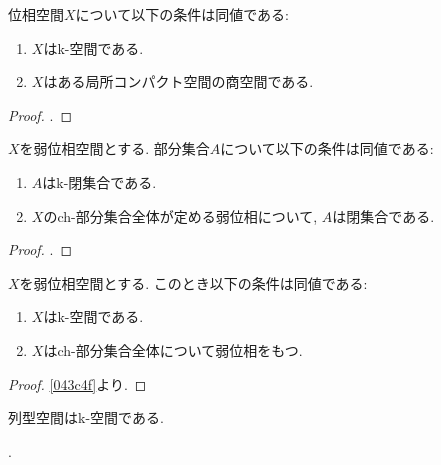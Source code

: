 \documentclass[uplatex, dvipdfmx, a4paper, 12pt, class=jsbook, crop=false]{standalone}
\begin{document}
\begin{proposition}
	位相空間$X$について以下の条件は同値である:
	\begin{enumerate}
		\item $X$はk-空間である.
		\item $X$はある局所コンパクト\Hausdorff 空間の商空間である.
	\end{enumerate}
\end{proposition}

\begin{proof}
	\WIP.
\end{proof}

\begin{proposition}
	\label{043c4f}
	$X$を弱\Hausdorff 位相空間とする.
	部分集合$A$について以下の条件は同値である:
	\begin{enumerate}
		\item $A$はk-閉集合である.
		\item $X$のch-部分集合全体が定める弱位相について, $A$は閉集合である.
	\end{enumerate}
\end{proposition}

\begin{proof}
	\WIP.
\end{proof}

\begin{corollary}
	$X$を弱\Hausdorff 位相空間とする.
	このとき以下の条件は同値である:
	\begin{enumerate}
		\item $X$はk-空間である.
		\item $X$はch-部分集合全体について弱位相をもつ.
	\end{enumerate}
\end{corollary}

\begin{proof}
	\cref{043c4f}より.
\end{proof}

\begin{proposition}
	列型\Hausdorff 空間はk-空間である.
\end{proposition}

\begin{proposition}
	\WIP.
\end{proposition}
\end{document}
